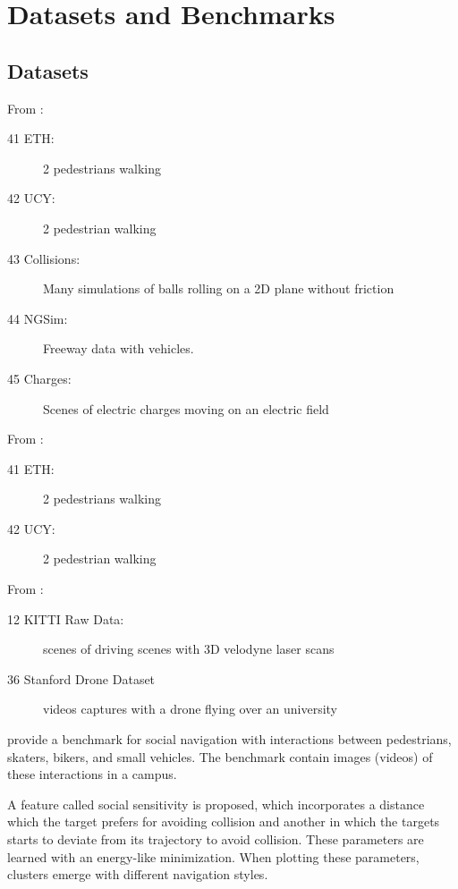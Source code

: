 \section{Datasets and Benchmarks}\label{sec: datasets and benchmarks}

\subsection{Datasets}

From \cite{xu2021tra2tra}: 
\begin{description}
	\item[41 ETH:] 2 pedestrians walking
	\item[42 UCY:] 2 pedestrian walking
	\item[43 Collisions:] Many simulations of balls rolling on a 2D plane without friction 
	\item[44 NGSim:] Freeway data with vehicles.
	\item[45 Charges:] Scenes of electric charges moving on an electric field
\end{description}

From \cite{ivanovic2019trajectron}:
\begin{description}
	\item[41 ETH:] 2 pedestrians walking
	\item[42 UCY:] 2 pedestrian walking
\end{description}

From \cite{lee2017desire}:
\begin{description}
	\item[12 KITTI Raw Data:] scenes of driving scenes with 3D velodyne laser scans
	\item[36 Stanford Drone Dataset] videos captures with a drone flying over an university
\end{description}



\cite{robicquet2016learning} provide a benchmark for social navigation with interactions between pedestrians, skaters, bikers, and small vehicles. 
%
The benchmark contain images (videos) of these interactions in a campus.

A feature called social sensitivity is proposed, which incorporates a distance which the target prefers for avoiding collision and another in which the targets starts to deviate from its trajectory to avoid collision.
%
These parameters are learned with an energy-like minimization.
%
When plotting these parameters, clusters emerge with different navigation styles.

